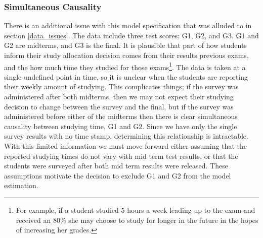 \documentclass[12pt]{article}
\begin{document}
\subsubsection{Simultaneous Causality} \label{simul_caus}
There is an additional issue with this model specification that was alluded to in section \ref{data_issues}. The data include three test scores: G1, G2, and G3. G1 and G2 are midterms, and G3 is the final. It is plausible that part of how students inform their study allocation decision comes from their results previous exams, and the how much time they studied for those exams\footnote{For example, if a student studied 5 hours a week leading up to the exam and received an 80\% she may choose to study for longer in the future in the hopes of increasing her grades.}. The data is taken at a single undefined point in time, so it is unclear when the students are reporting their weekly amount of studying. This complicates things; if the survey was administered after both midterms, then we may not expect their studying decision to change between the survey and the final, but if the survey was administered before either of the midterms then there is clear simultaneous causality between studying time, G1 and G2. Since we have only the single survey results with no time stamp, determining this relationship is intractable. With this limited information we must move forward either assuming that the reported studying times do not vary with mid term test results, or that the students were surveyed after both mid term results were released. These assumptions motivate the decision to exclude G1 and G2 from the model estimation.

\end{document}
